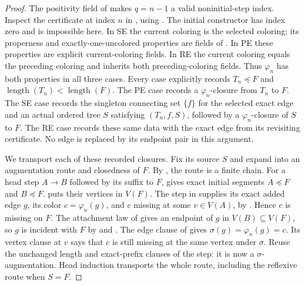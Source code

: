 \begin{proof}
The positivity field of  makes $q=n-1$
a valid noninitial-step index. Inspect the certificate at index $n$ in
, using . The initial
constructor has index zero and is impossible here. In SE the current
coloring is the selected coloring; its properness and exactly-one-uncolored
properties are fields of . In PE these
properties are explicit current-coloring fields. In RE the current
coloring equals the preceding coloring and inherits both preceding-coloring
fields. Thus $\varphi_n$ has both properties in all three cases.
Every case explicitly records $T_n\preccurlyeq F$ and
$\operatorname{length}(T_n)<\operatorname{length}(F)$.
The PE case records a $\varphi_n$-closure from $T_n$ to $F$.
The SE case records the singleton connecting set $\{f\}$ for the selected
exact edge and an actual ordered tree $S$ satisfying
$(T_n,f,S)$, followed by a
$\varphi_n$-closure of $S$ to $F$. The RE case records these same data
with the exact edge from its revisiting certificate. No edge is replaced
by its endpoint pair in this argument.

We transport each of these recorded closures. Fix its source $S$ and
expand  into an augmentation route and closedness
of $F$. By , the route is a finite
chain. For a head step $A\to B$ followed by its suffix to $F$,
 gives exact initial
segments $A\preccurlyeq F$ and $B\preccurlyeq F$.
 puts their vertices
in $V(F)$. The step in  supplies its exact
added edge $g$, its color $c=\varphi_n(g)$, and $c$ missing at some
$v\in V(A)$, by . Hence $c$ is missing on
$F$. The attachment law of  gives an endpoint of
$g$ in $V(B)\subseteq V(F)$, so $g$ is incident with $F$ by
 and . The edge clause of
 gives $\sigma(g)=\varphi_n(g)=c$. Its vertex
clause at $v$ says that $c$ is still missing at the same vertex under
$\sigma$. Reuse the unchanged length and exact-prefix clauses of the
step: it is now a $\sigma$-augmentation. Head induction transports the
whole route, including the reflexive route when $S=F$.


\end{proof}
